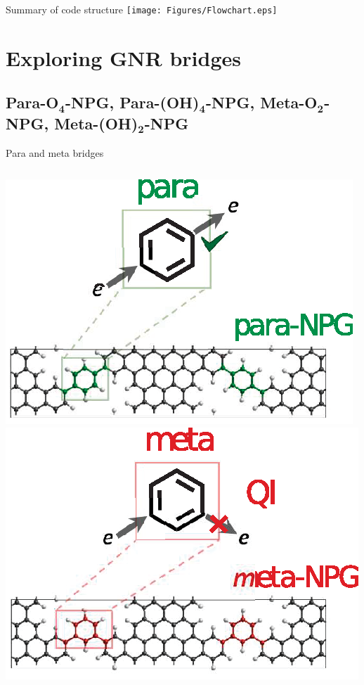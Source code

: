 \documentclass[hyperref={colorlinks=true,urlcolor=blue,linkcolor=.},aspectratio=1610,mathserif]{beamer}
\newcommand*\mathinhead[2]{\texorpdfstring{$\boldsymbol{#1}$}{#2}}
\begin{document}
\begin{frame}{Summary of code structure}
\centering
\texttt{[image: Figures/Flowchart.eps]}
\end{frame}

\section{Exploring GNR bridges}
\subsection{Para-O\mathinhead{_4}{_4}-NPG, Para-(OH)\mathinhead{_4}{_4}-NPG, Meta-O\mathinhead{_2}{_2}-NPG, Meta-(OH)\mathinhead{_2}{_2}-NPG}

\begin{frame}{Para and meta bridges}
\centering
\begin{overprint}
\centering
\begin{columns}[t]
    \includegraphics[height=.7\textwidth]{Figures/Parametagraphic.eps}
    \includegraphics[height=.7\textwidth]{Figures/Metaparagraphic.eps}

\end{columns}
\end{overprint}
\end{frame}
\end{document}
